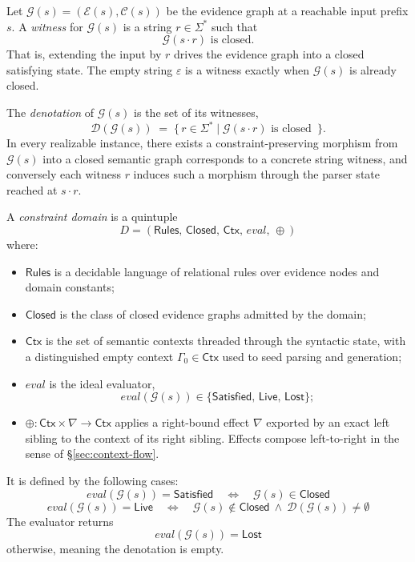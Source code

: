 \begin{definition}[Witness]
\label{def:witness}
Let \(\mathcal G(s) = (\mathcal E(s), \mathcal C(s))\) be the evidence graph at a reachable input prefix \(s\). A \emph{witness} for \(\mathcal G(s)\) is a string \(r \in \Sigma^\ast\) such that
\[
  \mathcal G(s \cdot r) \text{ is closed}.
\]
That is, extending the input by \(r\) drives the evidence graph into a closed satisfying state. The empty string \(\varepsilon\) is a witness exactly when \(\mathcal G(s)\) is already closed.
\end{definition}

\begin{definition}[Denotation]
\label{def:denotation}
The \emph{denotation} of \(\mathcal G(s)\) is the set of its witnesses,
\[
  \mathcal D(\mathcal G(s))
  \;=\;
  \bigl\{\,
    r \in \Sigma^\ast
    \;\big|\;
    \mathcal G(s \cdot r) \text{ is closed }
  \,\bigr\}.
\]
In every realizable instance, there exists a constraint-preserving morphism from
\(\mathcal G(s)\) into a closed semantic graph corresponds to a concrete string
witness, and conversely each witness \(r\) induces such a morphism through the
parser state reached at \(s\cdot r\).
\end{definition}

\begin{definition}
\label{def:constraint-domain}
A \emph{constraint domain} is a quintuple
\[
  D = ( \mathsf{Rules},\, \mathsf{Closed},\, \mathsf{Ctx},\, \mathit{eval},\, \oplus)
\]
where:
\begin{itemize}
  \item \(\mathsf{Rules}\) is a decidable language of relational rules over evidence nodes and domain constants;
  \item \(\mathsf{Closed}\) is the class of closed evidence graphs admitted by the domain;
  \item \(\mathsf{Ctx}\) is the set of semantic contexts threaded through the syntactic state, with a distinguished empty context \(\Gamma_0 \in \mathsf{Ctx}\) used to seed parsing and generation;
  \item \(\mathit{eval}\) is the ideal evaluator,
  \[
    \mathit{eval}(\mathcal G(s))
    \in
    \{\mathsf{Satisfied},\,\mathsf{Live},\,\mathsf{Lost}\};
  \]
  \item \(\oplus : \mathsf{Ctx} \times \nabla \to \mathsf{Ctx}\) applies a right-bound effect $\nabla$ exported by an exact left sibling to the context of its right sibling. Effects compose left-to-right in the sense of \S\ref{sec:context-flow}.
\end{itemize}
It is defined by the following cases:
\[
  \mathit{eval}(\mathcal G(s)) = \mathsf{Satisfied}
  \quad\Longleftrightarrow\quad
  \mathcal G(s) \in \mathsf{Closed}
\]
\[
  \mathit{eval}(\mathcal G(s)) = \mathsf{Live}
  \quad\Longleftrightarrow\quad
  \mathcal G(s) \notin \mathsf{Closed}
  \ \land\
  \mathcal D(\mathcal G(s)) \neq \emptyset
\]
The evaluator returns
\[
  \mathit{eval}(\mathcal G(s)) = \mathsf{Lost}
\]
otherwise, meaning the denotation is empty.
\end{definition}

